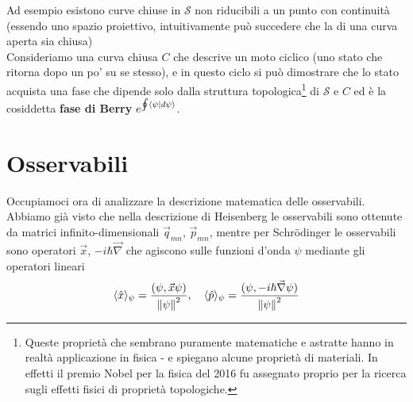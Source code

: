 \documentclass[FisicaTeorica.tex]{subfiles}
\begin{document}
\begin{enumerate}
	Ad esempio esistono curve chiuse in $\mathcal{S}$ non riducibili a un punto con continuità (essendo uno spazio proiettivo, intuitivamente può succedere che la  di una curva aperta sia chiusa)\\
	Consideriamo una curva chiusa $C$ che descrive un moto ciclico (uno stato che ritorna dopo un po' su se stesso), e in questo ciclo si può dimostrare che lo stato acquista una fase che dipende solo dalla struttura topologica\footnote{Queste proprietà che sembrano puramente matematiche e astratte hanno in realtà applicazione in fisica - e spiegano alcune proprietà di materiali. In effetti il premio Nobel per la fisica del 2016 fu assegnato proprio per la ricerca sugli effetti fisici di proprietà topologiche.} di $\mathcal{S}$ e $C$ ed è la cosiddetta \textbf{fase di Berry} $e^{\oint \braket{\psi|d\psi}}$. 
\end{enumerate}
	
\section{Osservabili}
Occupiamoci ora di analizzare la descrizione matematica delle osservabili.\\
Abbiamo già visto che nella descrizione di Heisenberg le osservabili sono ottenute da matrici infinito-dimensionali ${\vec{q}}_{mn}$, ${\vec{p}}_{mn}$, mentre per Schrödinger le osservabili sono operatori $\vec{x}$, $-i\hbar \vec{\nabla}$ che agiscono sulle funzioni d'onda $\psi$ mediante gli operatori lineari
\[
\langle \hat{x}\rangle_\psi = \frac{(\psi, \vec{x}\psi)}{\left\lVert\psi\right\rVert^2}, \quad \langle \hat{p}\rangle_\psi = \frac{(\psi, -i\hbar \vec{\nabla}\psi)}{\left\lVert\psi\right\rVert^2}
\]
\end{document}
